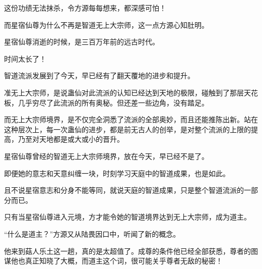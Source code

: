 \begin{this_body}
这份功绩无法抹杀，令方源每每想来，都深感可怕！

而星宿仙尊为什么不再是智道无上大宗师，这一点方源心知肚明。

星宿仙尊消逝的时候，是三百万年前的远古时代。

时间太长了！

智道流派发展到了今天，早已经有了翻天覆地的进步和提升。

准无上大宗师，是说蛊仙对此流派的认知已经达到天地的极限，碰触到了那层天花板，几乎穷尽了此流派的所有奥秘。但还差一些边角，没有踏足。

而无上大宗师境界，是不仅完全洞悉了流派的全部奥妙，而且还能推陈出新。站在这种层次上，每一次蛊仙的进步，都是前无古人的创举，是对整个流派的上限的提高，乃至对天地都是或大或小的晋升。

星宿仙尊曾经的智道无上大宗师境界，放在今天，早已经不是了。

即便她的意志和天意纠缠一块，时刻学习天庭中的智道成果，也是如此。

且不说星宿意志和分身不能等同，就说天庭的智道成果，只是整个智道流派的一部分而已。

只有当星宿仙尊进入元境，方才能令她的智道境界达到无上大宗师，成为道主。

“什么是道主？”方源又从陆畏因口中，听闻了新的概念。

他来到菇人乐土这一趟，真的是太超值了。成尊的条件他已经全部获悉，尊者的图谋他也真正知晓了大概，而道主这个词，很可能关乎尊者无敌的秘密！

\end{this_body}

